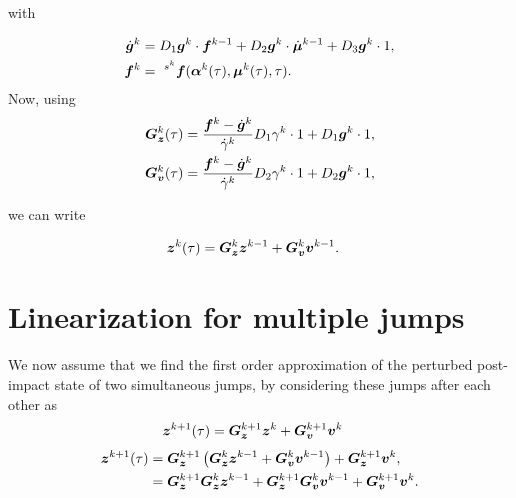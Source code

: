 \documentclass[../DC2017114Bouma.tex]{subfiles}
\begin{document}
with

\begin{align}
\dot{\gb}^k &= D_1\gb^k\cdot \fb^{k-1} + D_2\gb^k\cdot \dot{\mub}^{k-1} + D_3\gb^k\cdot 1,\\
\fb^k &=\ ^{s^k}\fb(\alphab^k(\tau),\mub^k(\tau),\tau).
\end{align}
Now, using
\begin{align}
\Gb_\zb^k(\tau) &= \frac{\fb^k - \dot{\gb}^k}{\dot{\gamma}^k}D_1\gamma^k\cdot 1 + D_1\gb^k \cdot 1,\\
\Gb_\vb^k(\tau) &= \frac{\fb^k - \dot{\gb}^k}{\dot{\gamma}^k}D_2\gamma^k\cdot 1 + D_2\gb^k \cdot 1,
\end{align}

we can write 

\begin{align}
\zb^k(\tau) &= \Gb_\zb^k\zb^{k-1} + \Gb_\vb^k\vb^{k-1}.
\end{align}

\section{Linearization for multiple jumps}\label{app:multjumps}
We now assume that we find the first order approximation of the perturbed post-impact state of two simultaneous jumps, by considering these jumps after each other as
\begin{align}
\zb^{k+1}(\tau) &= \Gb_\zb^{k+1}\zb^{k} + \Gb_\vb^{k+1}\vb^{k}
\end{align}
\begin{align}
\zb^{k+1}(\tau) &= \Gb_\zb^{k+1}\left(\Gb_\zb^k\zb^{k-1} + \Gb_\vb^k\vb^{k-1}\right) + \Gb_\zb^{k+1}\vb^{k},\\
&= \Gb_\zb^{k+1}\Gb_\zb^k\zb^{k-1} + \Gb_\zb^{k+1}\Gb_\vb^k\vb^{k-1} + \Gb_\vb^{k+1}\vb^{k}.\label{eq:zkplus}
\end{align}
\end{document}
